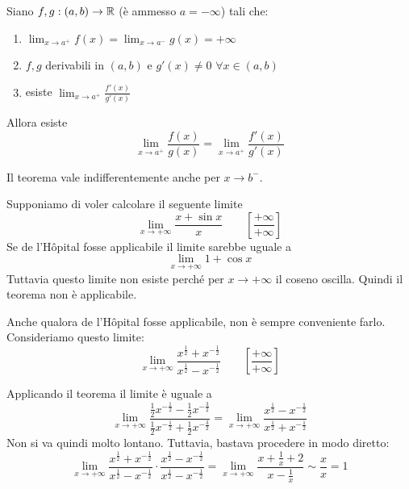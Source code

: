 \begin{theorem}
Siano $f, g : (a,b) \to \mathbb R$ (è ammesso $a = -\infty$) tali che:
\begin{enumerate}
\item $\lim_{x \to a^+} f(x) = \lim_{x \to a^-} g(x) = +\infty$
\item $f,g$ derivabili in $(a,b)$ e $g'(x) \neq 0$ $\forall x \in (a,b)$
\item esiste $\lim_{x \to a^+} \frac{f'(x)}{g'(x)}$
\end{enumerate}

Allora esiste
\begin{equation*}
\lim_{x \to a^+} \frac{f(x)}{g(x)} = \lim_{x \to a^+} \frac{f'(x)}{g'(x)}
\end{equation*}
\end{theorem}

\begin{remark}
Il teorema vale indifferentemente anche per $x \to b^-$.
\end{remark}

\begin{example}
Supponiamo di voler calcolare il seguente limite
\begin{equation*}
\lim_{x \to +\infty} \frac{x+\sin x}{x} \qquad \left[\frac{+\infty}{+\infty} \right]
\end{equation*}
Se de l'Hôpital fosse applicabile il limite sarebbe uguale a 
\begin{equation*}
\lim_{x \to +\infty} 1 + \cos x
\end{equation*}
Tuttavia questo limite non esiste perché per $x \to +\infty$ il coseno oscilla. Quindi il teorema non è applicabile.
\end{example}

\begin{example}
Anche qualora de l'Hôpital fosse applicabile, non è sempre conveniente farlo. Consideriamo questo limite:
\begin{equation*}
\lim_{x \to +\infty} \frac{x^\frac{1}{2} + x^{-\frac{1}{2}}}{x^\frac{1}{2} - x^{-\frac{1}{2}}} \qquad \left[\frac{+\infty}{+\infty}\right]
\end{equation*}

Applicando il teorema il limite è uguale a 
\begin{equation*}
\lim_{x \to +\infty} \frac{\frac{1}{2} x^{-\frac{1}{2}} - \frac{1}{2} x^{-\frac{3}{2}}}{\frac{1}{2} x^{-\frac{1}{2}} + \frac{1}{2} x^{-\frac{3}{2}}} = \lim_{x \to +\infty} \frac{x^\frac{1}{2} - x^{-\frac{1}{2}}}{x^\frac{1}{2} + x^{-\frac{1}{2}}}
\end{equation*}
Non si va quindi molto lontano. Tuttavia, bastava procedere in modo diretto:
\begin{equation*}
\lim_{x \to +\infty} \frac{x^\frac{1}{2} + x^{-\frac{1}{2}}}{x^\frac{1}{2} - x^{-\frac{1}{2}}} \cdot \frac{x^\frac{1}{2} - x^{-\frac{1}{2}}}{x^\frac{1}{2} - x^{-\frac{1}{2}}} = \lim_{x \to +\infty} \frac{x + \frac{1}{x} + 2}{x - \frac{1}{x}} \sim \frac{x}{x} = 1
\end{equation*}
\end{example}

